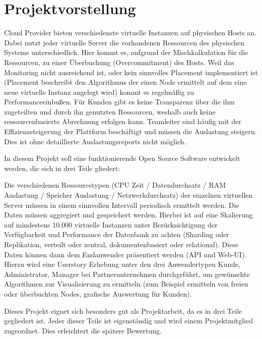 \section{Projektvorstellung}
\label{subsubsec:projektvorstellung}
Cloud Provider bieten verschiedenste virtuelle Instanzen auf physischen Hosts
an. Dabei nutzt jeder virtuelle Server die vorhandenen Ressourcen des
physischen Systems unterschiedlich. Hier kommt es, aufgrund der
Mischkalkulation für die Ressourcen, zu einer Überbuchung (Overcommitment) des
Hosts. Weil das Monitoring nicht ausreichend ist, oder kein sinnvolles
Placement implementiert ist (Placement beschreibt den Algorithmus der einen
Node ermittelt auf dem eine neue virtuelle Instanz angelegt wird) kommt es
regelmäßig zu Performanceeinbußen. Für Kunden gibt es keine Transparenz über
die ihm zugeteilten und durch ihn genutzten Ressourcen, weshalb auch keine
ressourcenbasierte Abrechnung erfolgen kann. Teamleiter sind häufig mit der
Effizienzsteigerung der Plattform beschäftigt und müssen die Auslastung
steigern. Dies ist ohne detaillierte Auslastungsreports nicht möglich.

In diesem Projekt soll eine funktionierende Open Source Software entwickelt
werden, die sich in drei Teile gliedert:

\begin{outline}
  \1 Die verschiedenen Ressourcetypen (CPU Zeit / Datendurchsatz / RAM
  Auslastung / Speicher Auslastung / Netzwerkdurchsatz) der einzelnen
  virtuellen Server müssen in einem sinnvollen Intervall periodisch ermittelt
  werden.
  \1 Die Daten müssen aggregiert und gespeichert werden. Hierbei ist auf eine
  Skalierung auf mindestens 10.000 virtuelle Instanzen unter Berücksichtigung
  der Verfügbarkeit und Performance der Datenbank zu achten (Sharding oder
  Replikation, verteilt oder zentral, dokumentenbasiert oder relational).
  \1 Diese Daten können dann dem Endanwender präsentiert werden (\gls{API} und
  Web-UI). Hierzu wird eine Userstory Erhebung unter den drei Anwendertypen
  Kunde, Administrator, Manager bei Partnerunternehmen durchgeführt, um
  gewünschte Algorithmen zur Visualisierung zu ermitteln (zum Beispiel
  ermitteln von freien oder überbuchten Nodes, grafische Auswertung für Kunden).
\end{outline}

Dieses Projekt eignet sich besonders gut als Projektarbeit, da es in drei Teile
gegliedert ist. Jeder dieser Teile ist eigenständig und wird einem
Projektmitglied zugeordnet. Dies erleichtert die spätere Bewertung.
\tm%

